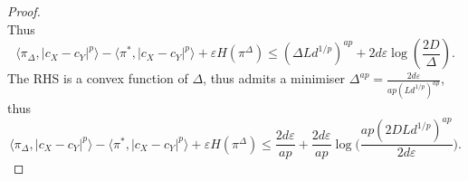 \begin{proof}
\begin{equation}
    \end{equation}
    Thus
    \begin{equation}
      \langle \pi_{\Delta}, \vert c_X - c_Y \vert^p \rangle -
      \langle \pi^*, \vert c_X - c_Y \vert^p \rangle + \varepsilon H(\pi^{\Delta})
      \leq (\Delta Ld^{1/p})^{ap} + 2 d \varepsilon \log(\frac{2D}{\Delta}).
    \end{equation}
    The RHS is a convex function of $\Delta$, thus admits a minimiser
    $\Delta^{ap} = \frac{2d \varepsilon}{ap (Ld^{1/p})^{ap}}$, thus
    \begin{equation}
      \langle \pi_{\Delta}, \vert c_X - c_Y \vert^p \rangle
      - \langle \pi^*, \vert c_X - c_Y \vert^p \rangle + \varepsilon H(\pi^{\Delta})
      \leq \frac{2 d \varepsilon}{ap}
      + \frac{2d \varepsilon}{ap} \log\Big( \frac{ap (2DLd^{1/p})^{ap}}{2d \varepsilon} \Big).
    \end{equation}
\end{proof}

